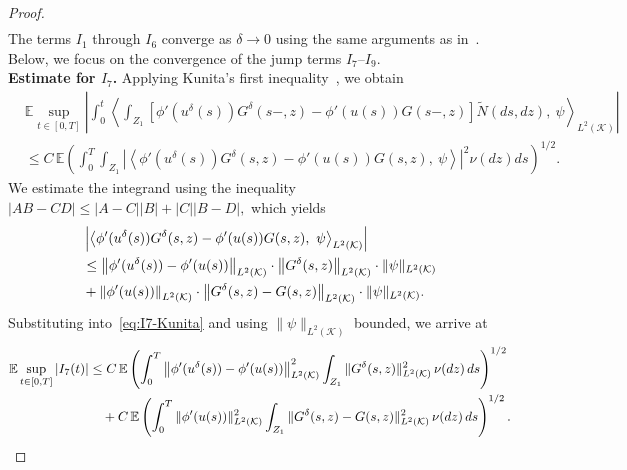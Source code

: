 \documentclass[11pt]{article}
\theoremstyle{plain}
\numberwithin{equation}{section}
\begin{document}
\begin{proof}
\begin{align}
\end{align}
The terms $I_1$ through $I_6$ converge as $\delta \to 0$ using the same arguments as in~\cite[Proposition A.1]{AMJ}. Below, we focus on the convergence of the jump terms $I_7$–$I_9$.\\
\smallskip
\noindent\textbf{Estimate for \boldmath$I_7$.}
Applying Kunita's first inequality~\cite[Theorem 4.4.23]{Applebaum}, we obtain
\begin{align}\label{eq:I7-Kunita}
&\mathbb{E} \sup_{t \in [0,T]} \left| \int_0^t \left\langle \int_{Z_1} \left[ \phi'(u^\delta(s)) G^\delta(s{-},z) - \phi'(u(s)) G(s{-},z) \right] \tilde N(ds,dz),\ \psi \right\rangle_{L^2(\mathcal{K})} \right|\nonumber\\
&\le C\,\mathbb{E} \left( \int_0^T \int_{Z_1} \left| \left\langle \phi'(u^\delta(s)) G^\delta(s,z) - \phi'(u(s)) G(s,z),\ \psi \right\rangle \right|^2 \nu(dz) ds \right)^{1/2}.
\end{align}
We  estimate the integrand using the inequality \(|A B - CD| \le |A - C||B| + |C||B - D|,\) which yields
\begin{align}
&\left| \left\langle \phi'(u^\delta(s)) G^\delta(s,z) - \phi'(u(s)) G(s,z),\ \psi \right\rangle_{L^2(\mathcal{K})} \right| \nonumber\\
&\le \left\| \phi'(u^\delta(s)) - \phi'(u(s)) \right\|_{L^2(\mathcal{K})} \cdot \left\| G^\delta(s,z) \right\|_{L^2(\mathcal{K})} \cdot \|\psi\|_{L^2(\mathcal{K})}\nonumber\\
&+ \left\| \phi'(u(s)) \right\|_{L^2(\mathcal{K})} \cdot \left\| G^\delta(s,z) - G(s,z) \right\|_{L^2(\mathcal{K})} \cdot \|\psi\|_{L^2(\mathcal{K})}. \notag
\end{align}
Substituting into~\eqref{eq:I7-Kunita} and using $\|\psi\|_{L^2(\mathcal{K})}$ bounded, we arrive at
\begin{align}\label{eq:I7-final}
\mathbb{E} \sup_{t \in [0,T]} |I_7(t)|
&\le C\,\mathbb{E} \left( \int_0^T \left\| \phi'(u^\delta(s)) - \phi'(u(s)) \right\|_{L^2(\mathcal{K})}^2
\int_{Z_1} \|G^\delta(s,z)\|_{L^2(\mathcal{K})}^2\, \nu(dz)\, ds \right)^{1/2} \notag\\
&\quad+ C\,\mathbb{E} \left( \int_0^T \| \phi'(u(s)) \|_{L^2(\mathcal{K})}^2
\int_{Z_1} \|G^\delta(s,z) - G(s,z)\|_{L^2(\mathcal{K})}^2\, \nu(dz)\, ds \right)^{1/2}.
\end{align}


\end{proof}
\end{document}
